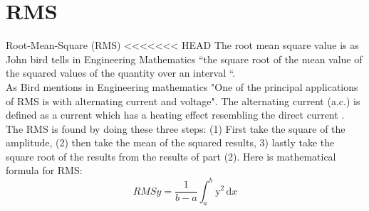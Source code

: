 \section{RMS}
Root-Mean-Square (RMS)
<<<<<<< HEAD
The root mean square value is as John bird tells in Engineering Mathematics \citep{Bird2007} “the square root of the mean value of the squared values of the quantity over an interval “.
\\
As Bird mentions in Engineering mathematics "One of the principal applications of RMS is with alternating current and voltage". \citep{Bird2007} The alternating current (a.c.) is defined as a current which has a heating effect resembling the direct current \citep{Bird2007}.
\\
The RMS is found by doing these three steps:
(1) First take the square of the amplitude, (2) then take the mean of the squared results, 3) lastly take the square root of the results from the results of part (2)\citep{Bird2007}. Here is \cite{Bird2007} mathematical formula for RMS:
\begin{equation}\label{eq:RMS formular}
RMSy = \frac{1}{b-a}\int_a^b\mathrm{y}^{2}\,\mathrm{d}x

\end{equation}
